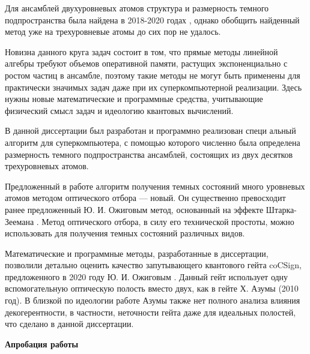 Для ансамблей двухуровневых атомов структура и размерность темного подпространства была найдена в 2018-2020 годах \cite{ozhigov_dimension}, однако обобщить найден­ный метод уже на трехуровневые атомы до сих пор не удалось.

Новизна данного круга задач состоит в том, что прямые методы линейной алгебры требуют объемов оперативной памяти, растущих экспоненциально с ростом частиц в ансамбле, поэтому такие методы не могут быть применены для практически значимых задач даже при их суперкомпьютерной реализации. Здесь нужны новые математические и программные средства, учитывающие физический смысл задач и идеологию квантовых вычислений.

В данной диссертации был разработан и программно реализован специ­ альный алгоритм для суперкомпьютера, с помощью которого численно была определена размерность темного подпространства ансамблей, состоящих из двух десятков трехуровневых атомов.

Предложенный в работе алгоритм получения темных состояний много­ уровневых атомов методом оптического отбора --- новый. Он существенно превосходит ранее предложенный Ю. И. Ожиговым метод, основанный на эффекте Штарка-Зеемана \cite{stark,zeeman_1,zeeman_2,zeeman_3}. Метод оптического отбора, в силу его тех­нической простоты, можно использовать для получения темных состояний различных видов.

Математические и программные методы, разработанные в диссерта­ции, позволили детально оценить качество запутывающего квантового гейта coCSign, предложенного в 2020 году Ю. И. Ожиговым \cite{ozhigov_quantum_electronics}. Данный гейт ис­пользует одну вспомогательную оптическую полость вместо двух, как в гейте Х. Азумы \cite{azuma} (2010 год). В близкой по идеологии работе Азумы \cite{azuma} также нет полного анализа влияния декогерентности, в частности, неточности гейта даже для идеальных полостей, что сделано в данной диссертации.

\clearpage
\textbf{Апробация работы}


